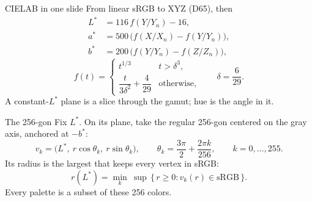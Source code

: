 \begin{slide}{CIELAB in one slide}
  From linear sRGB \cite{srgb} to XYZ (D65), then
  \begin{align*}
    L^* &= 116\, f(Y/Y_n) - 16, \\
    a^* &= 500\, \bigl(f(X/X_n) - f(Y/Y_n)\bigr), \\
    b^* &= 200\, \bigl(f(Y/Y_n) - f(Z/Z_n)\bigr),
  \end{align*}
  \[
    f(t) = \begin{cases}
      t^{1/3} & t > \delta^3, \\
      \dfrac{t}{3\delta^2} + \dfrac{4}{29} & \text{otherwise},
    \end{cases}
    \qquad \delta = \frac{6}{29}.
  \]
  A constant-$L^*$ plane is a slice through the gamut; hue is the angle in it.
\end{slide}

\begin{slide}{The 256-gon}
  Fix $L^*$. On its plane, take the regular 256-gon centered on the gray axis,
  anchored at $-b^*$:
  \[
    v_k = \bigl(L^*,\ r\cos\theta_k,\ r\sin\theta_k\bigr), \qquad
    \theta_k = \frac{3\pi}{2} + \frac{2\pi k}{256}, \qquad k = 0, \dots, 255.
  \]
  Its radius is the largest that keeps every vertex in sRGB:
  \[
    r(L^*) = \min_{k}\ \sup\,\{\, r \ge 0 : v_k(r) \in \text{sRGB} \,\}.
  \]
  Every palette is a subset of these 256 colors.
\end{slide}

